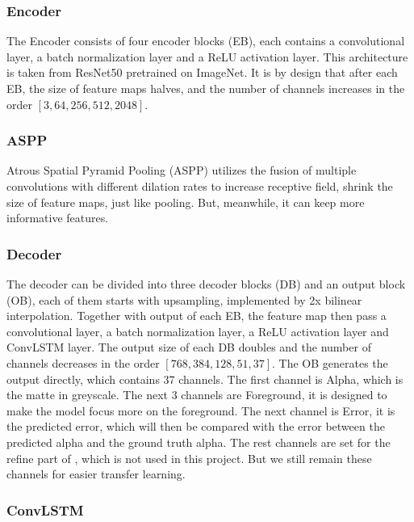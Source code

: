 \documentclass[final]{cvpr}
\begin{document}
\subsubsection{Encoder}

The Encoder consists of four encoder blocks (EB), each contains a convolutional layer, a batch normalization layer and a ReLU activation layer.
This architecture is taken from ResNet50 pretrained on ImageNet.
It is by design that after each EB, the size of feature maps halves, and the number of channels increases in the order $[3, 64, 256, 512, 2048]$.

\subsubsection{ASPP}

Atrous Spatial Pyramid Pooling (ASPP) utilizes the fusion of multiple convolutions with different dilation rates to increase receptive field, shrink the size of feature maps, just like pooling.
But, meanwhile, it can keep more informative features.

\subsubsection{Decoder}

The decoder can be divided into three decoder blocks (DB) and an output block (OB), each of them starts with upsampling, implemented by 2x bilinear interpolation.
Together with output of each EB, the feature map then pass a convolutional layer, a batch normalization layer, a ReLU activation layer and ConvLSTM layer.
The output size of each DB doubles and the number of channels decreases in the order  $[768, 384, 128, 51, 37]$.
The OB generates the output directly, which contains 37 channels.
The first channel is Alpha, which is the matte in greyscale.
The next 3 channels are Foreground, it is designed to make the model focus more on the foreground.
The next channel is Error, it is the predicted error, which will then be compared with the error between the predicted alpha and the ground truth alpha.
The rest channels are set for the refine part of \cite{linRealTimeHighResolutionBackground2020a}, which is not used in this project.
But we still remain these channels for easier transfer learning.

\subsubsection{ConvLSTM}
\end{document}
